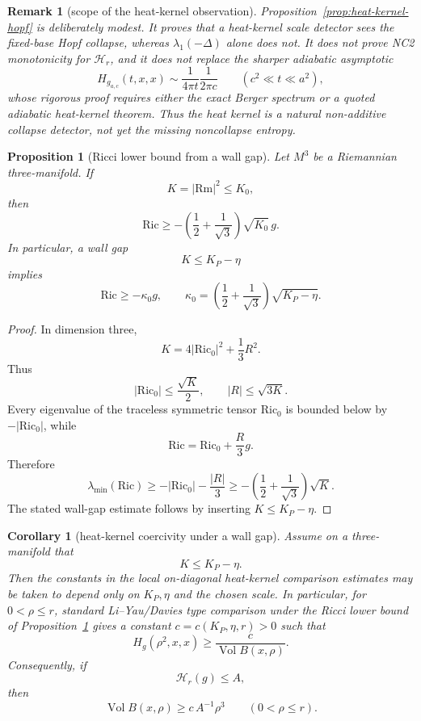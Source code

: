 \documentclass[11pt]{amsart}
\newtheorem{proposition}{Proposition}
\newtheorem{corollary}{Corollary}
\newtheorem{remark}{Remark}
\newcommand{\Rm}{\mathrm{Rm}}
\newcommand{\Ric}{\mathrm{Ric}}
\newcommand{\KP}{K_{\!P}}
\newcommand{\Vol}{\operatorname{Vol}}
\begin{document}
\begin{remark}[scope of the heat-kernel observation]\label{rem:heat-kernel-scope}
Proposition~\ref{prop:heat-kernel-hopf} is deliberately modest.  It proves
that a heat-kernel scale detector sees the fixed-base Hopf collapse, whereas
\(\lambda_1(-\Delta)\) alone does not.  It does not prove NC2 monotonicity for
\(\mathcal H_r\), and it does not replace the sharper adiabatic asymptotic
\[
        H_{g_{a,c}}(t,x,x)
        \sim
        \frac{1}{4\pi t}\frac{1}{2\pi c}
        \qquad(c^2\ll t\ll a^2),
\]
whose rigorous proof requires either the exact Berger spectrum or a quoted
adiabatic heat-kernel theorem.  Thus the heat kernel is a natural
non-additive collapse detector, not yet the missing noncollapse entropy.
\end{remark}


\begin{proposition}[Ricci lower bound from a wall gap]\label{prop:ricci-lower-from-wall-gap}
Let \(M^3\) be a Riemannian three-manifold.  If
\[
        K=|\Rm|^2\le K_0,
\]
then
\[
        \Ric
        \ge
        -\left(\frac12+\frac1{\sqrt3}\right)\sqrt{K_0}\,g .
\]
In particular, a wall gap
\[
        K\le \KP-\eta
\]
implies
\[
        \Ric
        \ge
        -\kappa_0 g,
        \qquad
        \kappa_0
        =
        \left(\frac12+\frac1{\sqrt3}\right)\sqrt{\KP-\eta}.
\]
\end{proposition}

\begin{proof}
In dimension three,
\[
        K=4|\Ric_0|^2+\frac13R^2.
\]
Thus
\[
        |\Ric_0|\le\frac{\sqrt K}{2},
        \qquad
        |R|\le \sqrt{3K}.
\]
Every eigenvalue of the traceless symmetric tensor \(\Ric_0\) is bounded below
by \(-|\Ric_0|\), while
\[
        \Ric=\Ric_0+\frac R3g.
\]
Therefore
\[
        \lambda_{\min}(\Ric)
        \ge
        -|\Ric_0|-\frac{|R|}{3}
        \ge
        -\left(\frac12+\frac1{\sqrt3}\right)\sqrt K.
\]
The stated wall-gap estimate follows by inserting \(K\le \KP-\eta\).
\end{proof}

\begin{corollary}[heat-kernel coercivity under a wall gap]\label{cor:heat-kernel-coercivity}
Assume on a three-manifold that
\[
        K\le\KP-\eta .
\]
Then the constants in the local on-diagonal heat-kernel comparison estimates
may be taken to depend only on \(\KP,\eta\) and the chosen scale.  In
particular, for \(0<\rho\le r\), standard Li--Yau/Davies type comparison under
the Ricci lower bound of Proposition~\ref{prop:ricci-lower-from-wall-gap}
gives a constant \(c=c(\KP,\eta,r)>0\) such that
\[
        H_g(\rho^2,x,x)
        \ge
        \frac{c}{\Vol B(x,\rho)}.
\]
Consequently, if
\[
        \mathcal H_r(g)\le A,
\]
then
\[
        \Vol B(x,\rho)
        \ge
        c\,A^{-1}\rho^3
        \qquad
        (0<\rho\le r).
\]
\end{corollary}
\end{document}
